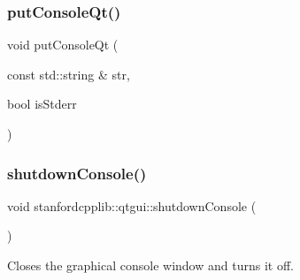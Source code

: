\subsubsection{\texorpdfstring{put\+Console\+Qt()}{putConsoleQt()}}
{\footnotesize\ttfamily void put\+Console\+Qt (\begin{DoxyParamCaption}\item[{const std\+::string \&}]{str,  }\item[{bool}]{is\+Stderr }\end{DoxyParamCaption})}

\mbox{\label{namespacestanfordcpplib_1_1qtgui_a2e21b562ecbfabf3b033ecf4cb370b50}} 
\subsubsection{\texorpdfstring{shutdown\+Console()}{shutdownConsole()}}
{\footnotesize\ttfamily void stanfordcpplib\+::qtgui\+::shutdown\+Console (\begin{DoxyParamCaption}{ }\end{DoxyParamCaption})}



Closes the graphical console window and turns it off. 

